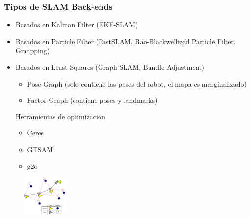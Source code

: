 \begin{frame}
    \frametitle{Tipos de SLAM Back-ends}
    \begin{itemize}
        \item Basados en Kalman Filter (EKF-SLAM)
        \item Basados en Particle Filter (FastSLAM, Rao-Blackwellized Particle Filter, Gmapping)
        \item Basados en Least-Squares (Graph-SLAM, Bundle Adjustment)
        \begin{itemize}
            \item Pose-Graph (solo contiene las poses del robot, el mapa es marginalizado)
            \item Factor-Graph (contiene poses y landmarks)
        \end{itemize}
            Herramientas de optimización
            \begin{itemize}
            \item Ceres
            \item GTSAM
            \item g2o
            \end{itemize}
    \end{itemize}

	\begin{figure}[!h]
        \includegraphics[width=0.2\textwidth]{images/slam-landmarks.pdf}
    \end{figure}
    
\end{frame}

